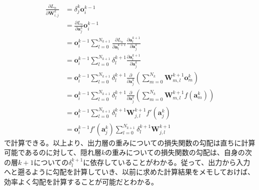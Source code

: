 \documentclass[12pt]{jarticle}
\numberwithin{equation}{section}    %
\numberwithin{figure}{section}      %
\numberwithin{table}{section}      %
\begin{document}
\begin{align}
    \frac{\partial L_{n}}{\partial \bm{W}_{i, j}^{k}} & = \delta_{j}^{k} \bm{o}_{i}^{k - 1}                                                                                                                                                   \\
                                                      & = \frac{\partial L_{n}}{\partial \bm{a}_{j}^{k}} \bm{o}_{i}^{k - 1}                                                                                                                   \\
                                                      & = \bm{o}_{i}^{k - 1} \sum_{l = 0}^{N_{k + 1}} \frac{\partial L_{n}}{\partial \bm{a}_{l}^{k + 1}} \frac{\partial \bm{a}_{l}^{k + 1}}{\partial \bm{a}_{j}^{k}}                          \\
                                                      & = \bm{o}_{i}^{k - 1} \sum_{l = 0}^{N_{k + 1}} \delta_{l}^{k + 1} \frac{\partial \bm{a}_{l}^{k + 1}}{\partial \bm{a}_{j}^{k}}                                                          \\
                                                      & = \bm{o}_{i}^{k - 1} \sum_{l = 0}^{N_{k + 1}} \delta_{l}^{k + 1} \frac{\partial}{\partial \bm{a}_{j}^{k}} \left( \sum_{m = 0}^{N_{k}} \bm{W}_{m, l}^{k + 1} \bm{o}_{m}^{k} \right)    \\
                                                      & = \bm{o}_{i}^{k - 1} \sum_{l = 0}^{N_{k + 1}} \delta_{l}^{k + 1} \frac{\partial}{\partial \bm{a}_{j}^{k}} \left( \sum_{m = 0}^{N_{k}} \bm{W}_{m, l}^{k + 1} f(\bm{a}_{m}^{k}) \right) \\
                                                      & = \bm{o}_{i}^{k - 1} \sum_{l = 0}^{N_{k + 1}} \delta_{l}^{k + 1} \bm{W}_{j, l}^{k + 1} f'(\bm{a}_{j}^{k})                                                                             \\
                                                      & = \bm{o}_{i}^{k - 1} f'(\bm{a}_{j}^{k}) \sum_{l = 0}^{N_{k + 1}} \delta_{l}^{k + 1} \bm{W}_{j, l}^{k + 1}
\end{align}
で計算できる。以上より、出力層の重みについての損失関数の勾配は直ちに計算可能であるのに対して、隠れ層$k$の重みについての損失関数の勾配は、自身の次の層$k + 1$についての$\delta_{l}^{k + 1}$に依存していることがわかる。従って、出力から入力へと遡るように勾配を計算していき、以前に求めた計算結果をメモしておけば、効率よく勾配を計算することが可能だとわかる。
\end{document}
